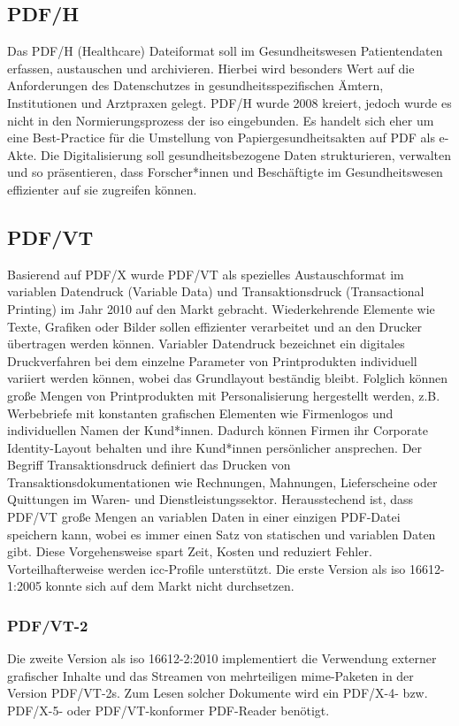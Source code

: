 \subsection{PDF/H}
Das PDF/H (Healthcare) Dateiformat soll im Gesundheitswesen Patientendaten erfassen, austauschen und archivieren. Hierbei wird besonders Wert auf die Anforderungen des Datenschutzes in gesundheitsspezifischen Ämtern, Institutionen und Arztpraxen gelegt. PDF/H wurde 2008 kreiert, jedoch wurde es nicht in den Normierungsprozess der \gls{iso} eingebunden. \cite{proj-consult} Es handelt sich eher um eine Best-Practice für die Umstellung von Papiergesundheitsakten auf PDF als e-Akte. Die Digitalisierung soll gesundheitsbezogene Daten strukturieren, verwalten und so präsentieren, dass Forscher*innen und Beschäftigte im Gesundheitswesen effizienter auf sie zugreifen können.


\subsection{PDF/VT}
Basierend auf PDF/X wurde PDF/VT als spezielles Austauschformat im variablen Datendruck (Variable Data) und Transaktionsdruck (Transactional Printing) im Jahr 2010 auf den Markt gebracht. \cite{adobe-pdf-vt} Wiederkehrende Elemente wie Texte, Grafiken oder Bilder sollen effizienter verarbeitet und an den Drucker übertragen werden können. \cite{adobe-pdf-e} Variabler Datendruck bezeichnet ein digitales Druckverfahren bei dem einzelne Parameter von Printprodukten individuell variiert werden können, wobei das Grundlayout beständig bleibt. Folglich können große Mengen von Printprodukten mit Personalisierung hergestellt werden, z.B. Werbebriefe mit konstanten grafischen Elementen wie Firmenlogos und individuellen Namen der Kund*innen. Dadurch können Firmen ihr Corporate Identity-Layout behalten und ihre Kund*innen persönlicher ansprechen. Der Begriff Transaktionsdruck definiert das Drucken von Transaktionsdokumentationen wie Rechnungen, Mahnungen, Lieferscheine oder Quittungen im Waren- und Dienstleistungssektor. Herausstechend ist, dass PDF/VT große Mengen an variablen Daten in einer einzigen PDF-Datei speichern kann, wobei es immer einen Satz von statischen und variablen Daten gibt. Diese Vorgehensweise spart Zeit, Kosten und reduziert Fehler. Vorteilhafterweise werden \gls{icc}-Profile unterstützt. \cite{adobe-pdf-vt} Die erste Version als \gls{iso} 16612-1:2005 konnte sich auf dem Markt nicht durchsetzen. \cite{proj-consult}

\subsubsection{PDF/VT-2}
Die zweite Version als \gls{iso} 16612-2:2010 implementiert die Verwendung externer grafischer Inhalte und das Streamen von mehrteiligen \gls{mime}-Paketen in der Version PDF/VT-2s. Zum Lesen solcher Dokumente wird ein PDF/X-4- bzw. PDF/X-5- oder PDF/VT-konformer PDF-Reader benötigt. \cite{proj-consult}

